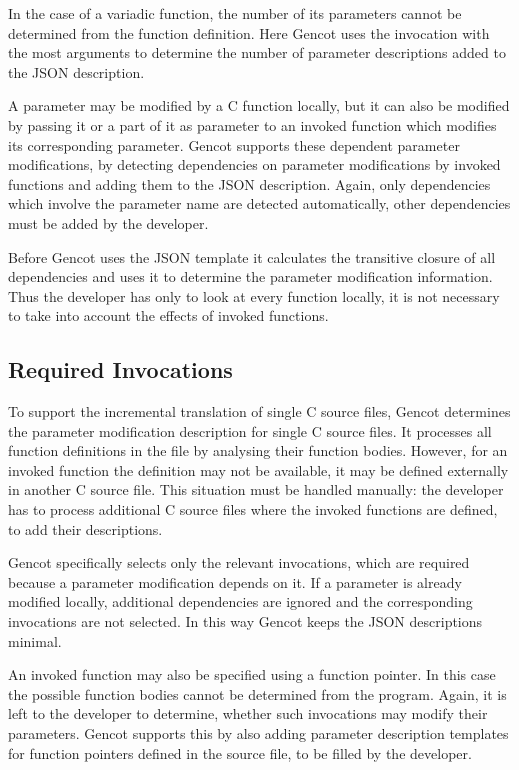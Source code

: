 In the case of a variadic function, the number of its parameters cannot be determined from the function definition.
Here Gencot uses the invocation with the most arguments to determine the number of parameter descriptions added
to the JSON description.

A parameter may be modified by a C function locally, but it can 
also be modified by passing it or a part of it as parameter to an invoked function which modifies its corresponding
parameter. Gencot supports these dependent parameter modifications, by detecting dependencies on parameter
modifications by invoked functions and adding them to the JSON description. Again, only dependencies which
involve the parameter name are detected automatically, other dependencies must be added by the developer.

Before Gencot uses the JSON template it calculates the transitive closure of all dependencies and uses it to
determine the parameter modification information. Thus the developer has only to look at every function locally,
it is not necessary to take into account the effects of invoked functions.

\subsection{Required Invocations}

To support the incremental translation of single C source files, Gencot determines the parameter modification
description for single C source files. It processes all function definitions in the file by analysing their 
function bodies. However, for an invoked function the definition may not be available, it may be defined externally
in another C source file. This situation must be handled manually: the developer has to process additional
C source files where the invoked functions are defined, to add their descriptions.

Gencot specifically selects only the relevant invocations, which are required because a parameter modification depends on it.
If a parameter is already modified locally, additional dependencies are ignored and the corresponding invocations
are not selected. In this way Gencot keeps the JSON descriptions minimal.

An invoked function may also be specified using a function pointer. In this case the possible function bodies cannot 
be determined from the program. Again, it is left to the developer to determine, whether such invocations may modify
their parameters. Gencot supports this by also adding parameter description templates for function pointers defined in the 
source file, to be filled by the developer. 

